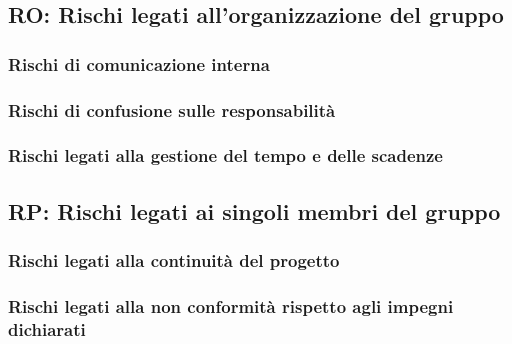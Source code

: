 \subsection{RO: Rischi legati all'organizzazione del gruppo}
\subsubsection{Rischi di comunicazione interna}
\subsubsection{Rischi di confusione sulle responsabilità}
\subsubsection{Rischi legati alla gestione del tempo e delle scadenze}
\subsection{RP: Rischi legati ai singoli membri del gruppo}
\subsubsection{Rischi legati alla continuità del progetto}
\subsubsection{Rischi legati alla non conformità rispetto agli impegni dichiarati}